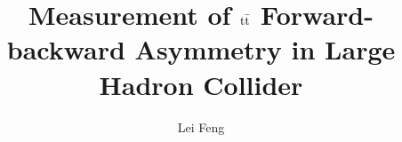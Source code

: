\documentclass[12pt,a4paper,oneside,final]{thesis}
\begin{document}
\title{Measurement of $\mathrm{t}\bar{\mathrm{t}}$ Forward-backward Asymmetry in Large Hadron Collider }
\author{Lei Feng}
\dissertation
\doctorphilosophy
\copyrightnotice



 
 
 
 

 

  

%



\end{document}
